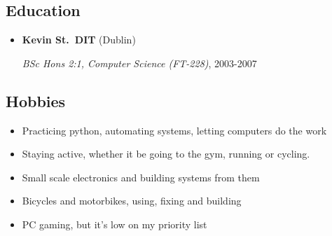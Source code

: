 \documentclass[]{article}
\begin{document}
\hypertarget{education}{%
\subsection{Education}\label{education}}

\begin{itemize}
\item
  \textbf{Kevin St.~DIT} (Dublin)

  \emph{BSc Hons 2:1, Computer Science (FT-228)}, 2003-2007
\end{itemize}

\hypertarget{hobbies}{%
\subsection{Hobbies}\label{hobbies}}

\begin{itemize}
\item
  Practicing python, automating systems, letting computers do the work
\item
  Staying active, whether it be going to the gym, running or cycling.
\item
  Small scale electronics and building systems from them
\item
  Bicycles and motorbikes, using, fixing and building
\item
  PC gaming, but it's low on my priority list
\end{itemize}
\end{document}
